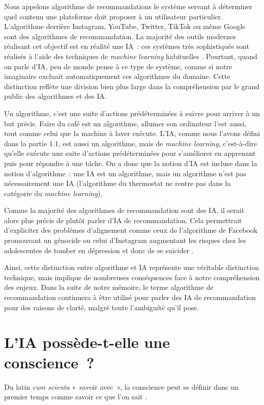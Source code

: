 \documentclass[a4paper, titlepage, 12pt]{article}
\begin{document}
	Nous appelons algorithme de recommandations le système servant à déterminer quel contenu une plateforme doit proposer à un utilisateur particulier. L'algorithme derrière Instagram, YouTube, Twitter, TikTok ou même Google sont des algorithmes de recommandation. La majorité des outils modernes réalisant cet objectif est en réalité une IA~: ces systèmes très sophistiqués sont réalisés à l'aide des techniques de \textit{machine learning} habituelles \cite{nguyenhoangMillionMilliardsDilemmes2021}. Pourtant, quand on parle d'IA, peu de monde pense à ce type de système, comme si notre imaginaire excluait automatiquement ces algorithmes du domaine. Cette distinction reflète une division bien plus large dans la compréhension par le grand public des algorithmes et des IA.

	Un algorithme, c'est une suite d'actions prédéterminées à suivre pour arriver à un but précis. Faire du café est un algorithme, allumer son ordinateur l'est aussi, tout comme celui que la machine à laver exécute. L'IA, comme nous l'avons défini dans la partie 1.1, est aussi un algorithme, mais de \textit{machine learning}, c'est-à-dire qu'elle exécute une suite d'actions prédéterminées pour s'améliorer en apprenant puis pour répondre à une tâche. On a donc que la notion d'IA est incluse dans la notion d'algorithme~: une IA est un algorithme, mais un algorithme n'est pas nécessairement une IA (l'algorithme du thermostat ne rentre pas dans la catégorie du \textit{machine learning}).

	Comme la majorité des algorithmes de recommandation sont des IA, il serait alors plus précis de plutôt parler d'IA de recommandation. Cela permettrait d'expliciter des problèmes d'alignement comme ceux de l'algorithme de Facebook promouvant un génocide \cite{MyanmarSocialAtrocity2022} ou celui d'Instagram augmentant les risques chez les adolescentes de tomber en dépression et donc de se suicider \cite{wellsFacebookFiles2021}.

	Ainsi, cette distinction entre algorithme et IA représente une véritable distinction technique, mais implique de nombreuses conséquences face à notre compréhension des enjeux. Dans la suite de notre mémoire, le terme algorithme de recommandation continuera à être utilisé pour parler des IA de recommandation pour des raisons de clarté, malgré toute l'ambiguïté qu'il pose.
	\newpage
	\section{L'IA possède-t-elle une conscience~?}
	Du latin \textit{cum scienta} «~savoir avec~», la conscience peut se définir dans un premier temps comme savoir ce que l’on sait \cite{wiktionnaireConscience2025}.
\end{document}
